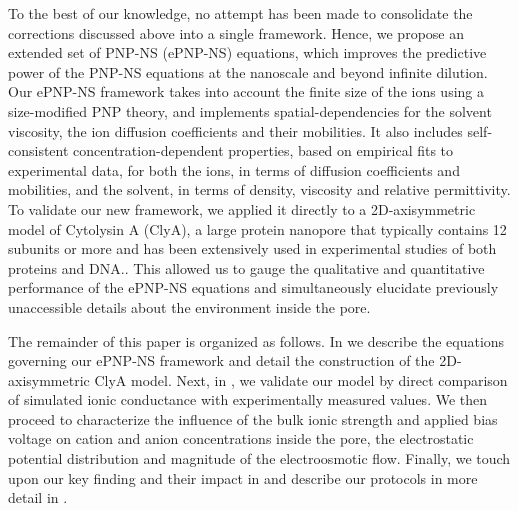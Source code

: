 \documentclass[journal=ancac3,manuscript=article,etalmode=truncate,maxauthors=0,layout=onecolumn]{achemso}
\begin{document}
To the best of our knowledge, no attempt has been made to consolidate the corrections discussed above into a
single framework. Hence, we propose an extended set of PNP-NS (ePNP-NS) equations, which improves the
predictive power of the PNP-NS equations at the nanoscale and beyond infinite dilution. Our ePNP-NS framework
takes into account the finite size of the ions using a size-modified PNP theory,\cite{Lu-2011} and implements
spatial-dependencies for the solvent viscosity,\cite{Pronk-2014,Hsu-2017} the ion diffusion coefficients and
their mobilities.\cite{Makarov-1998,Noskov-2004} It also includes self-consistent concentration-dependent
properties, based on empirical fits to experimental data, for both the ions, in terms of diffusion
coefficients and mobilities,\cite{Baldessari-2008-1,Mills-1989} and the solvent, in terms of density,
viscosity\cite{Hai-Lang-1996} and relative permittivity\cite{Gavish-2016}. To validate our new framework, we
applied it directly to a 2D-axisymmetric model of Cytolysin A (ClyA), a large protein nanopore that typically
contains 12 subunits\cite{Mueller-2009} or more\cite{Soskine-2013} and has been extensively used in
experimental studies of both proteins\cite{Soskine-2013,VanMeervelt-2014,Soskine-Biesemans-2015,
Biesemans-Soskine-2015,Wloka-2017,VanMeervelt-2017,Galenkamp-2018} and DNA.\cite{Franceschini-2013,
Franceschini-2016}. This allowed us to gauge the qualitative and quantitative performance of the ePNP-NS
equations and simultaneously elucidate previously unaccessible details about the environment inside the pore.

The remainder of this paper is organized as follows. In \emph{} we describe the equations
governing our ePNP-NS framework and detail the construction of the 2D-axisymmetric ClyA model. Next, in
\emph{}, we validate our model by direct comparison of simulated ionic conductance with
experimentally measured values. We then proceed to characterize the influence of the bulk ionic strength and
applied bias voltage on cation and anion concentrations inside the pore, the electrostatic potential
distribution and magnitude of the electroosmotic flow. Finally, we touch upon our key finding and their impact
in \emph{} and describe our protocols in more detail in \emph{}.
\end{document}
